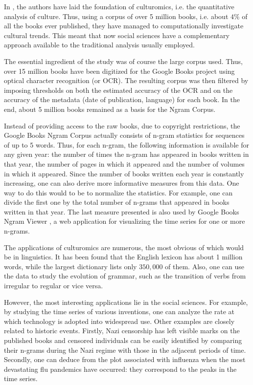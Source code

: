 
In , the authors have laid the foundation of culturomics, i.e. the quantitative analysis of culture. Thus, using a corpus of over 5 million books, i.e. about $4 \%$ of all the books ever published, they have managed to computationally investigate cultural trends. This meant that now social sciences have a complementary approach available to the traditional analysis usually employed.

The essential ingredient of the study was of course the large corpus used. Thus, over 15 million books have been digitized for the Google Books project using optical character recognition (or OCR). The resulting corpus was then filtered by imposing thresholds on both the estimated accuracy of the OCR and on the accuracy of the metadata (date of publication, language) for each book. In the end, about 5 million books remained as a basis for the Ngram Corpus.

Instead of providing access to the raw books, due to copyright restrictions, the Google Books Ngram Corpus actually consists of n-gram statistics for sequences of up to 5 words. Thus, for each n-gram, the following information is available for any given year: the number of times the n-gram has appeared in books written in that year, the number of pages in which it appeared and the number of volumes in which it appeared. Since the number of books written each year is constantly increasing, one can also derive more informative measures from this data. One way to do this would to be to normalize the statistics. For example, one can divide the first one by the total number of n-grams that appeared in books written in that year. The last measure presented is also used by Google Books Ngram Viewer , a web application for visualizing the time series for one or more n-grams.

The applications of culturomics are numerous, the most obvious of which would be in linguistics. It has been found that the English lexicon has about 1 million words, while the largest dictionary lists only $350,000$ of them. Also, one can use the data to study the evolution of grammar, such as the transition of verbs from irregular to regular or vice versa.

However, the most interesting applications lie in the social sciences. For example, by studying the time series of various inventions, one can analyze the rate at which technology is adopted into widespread use. Other examples are closely related to historic events. Firstly, Nazi censorship has left visible marks on the published books and censored individuals can be easily identified by comparing their n-grams during the Nazi regime with those in the adjacent periods of time. Secondly, one can deduce from the plot associated with influenza when the most devastating flu pandemics have occurred: they correspond to the peaks in the time series.

